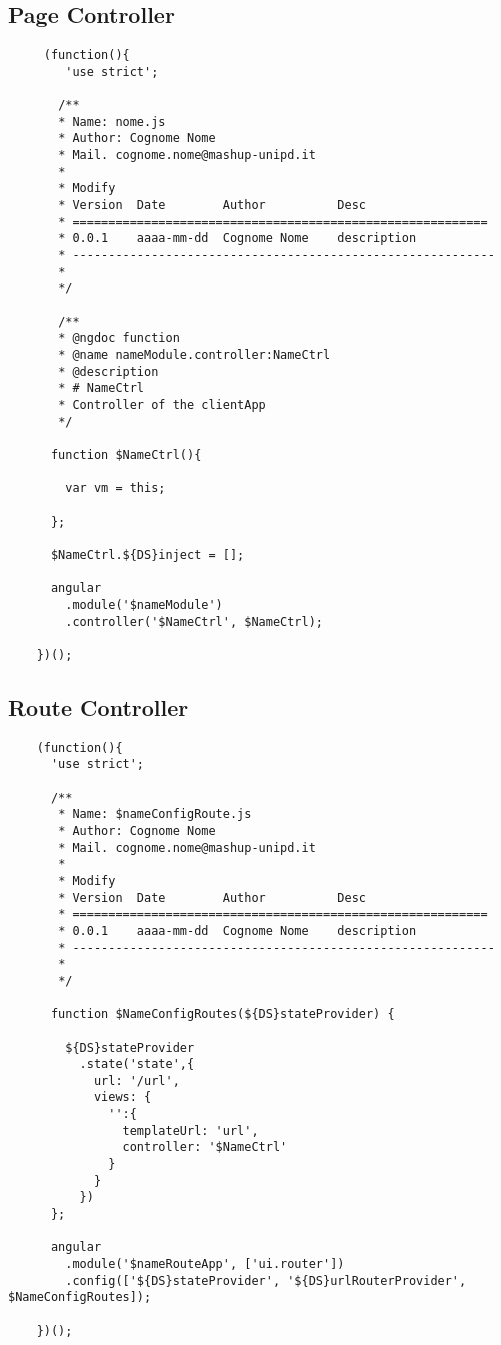 	\subsection{Page Controller} %
	\label{sub:page_controller}
	\begin{verbatim}
	 (function(){
	    'use strict';

	   /**
	   * Name: nome.js
	   * Author: Cognome Nome
	   * Mail. cognome.nome@mashup-unipd.it
	   *
	   * Modify
	   * Version  Date        Author          Desc
	   * ==========================================================
	   * 0.0.1    aaaa-mm-dd  Cognome Nome    description
	   * -----------------------------------------------------------
	   *
	   */

	   /**
	   * @ngdoc function
	   * @name nameModule.controller:NameCtrl
	   * @description
	   * # NameCtrl
	   * Controller of the clientApp
	   */

	  function $NameCtrl(){

	    var vm = this;

	  };

	  $NameCtrl.${DS}inject = [];

	  angular
		.module('$nameModule')
		.controller('$NameCtrl', $NameCtrl);

	})();
	\end{verbatim}

	\subsection{Route Controller} %
	\label{sub:route_controller}
	\begin{verbatim}
	(function(){
	  'use strict';

	  /**
	   * Name: $nameConfigRoute.js
	   * Author: Cognome Nome
	   * Mail. cognome.nome@mashup-unipd.it
	   *
	   * Modify
	   * Version  Date        Author          Desc
	   * ==========================================================
	   * 0.0.1    aaaa-mm-dd  Cognome Nome    description
	   * -----------------------------------------------------------
	   *
	   */

	  function $NameConfigRoutes(${DS}stateProvider) {

	    ${DS}stateProvider
	      .state('state',{
	        url: '/url',
	        views: {
	          '':{
	            templateUrl: 'url',
	            controller: '$NameCtrl'
	          }
	        }
	      })
	  };

	  angular
		.module('$nameRouteApp', ['ui.router'])
	    .config(['${DS}stateProvider', '${DS}urlRouterProvider', $NameConfigRoutes]);

	})();
	\end{verbatim}


